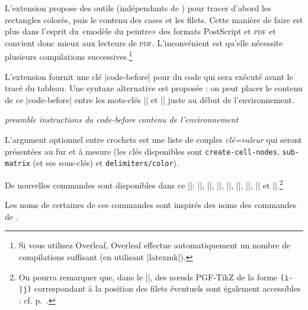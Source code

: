 \documentclass[dvipsnames]{article}%
\begin{document}
\label{color-in-code-before}

L'extension  propose des outils (indépendants de )
pour tracer d'abord les rectangles colorés, puis le contenu des cases et les
filets. Cette manière de faire est plus dans l'esprit du «modèle du peintre» des
formats PostScript et \textsc{pdf} et convient donc mieux aux lecteurs de
\textsc{pdf}. L'inconvénient est qu'elle nécessite plusieurs compilations
successives.\footnote{Si vous utilisez Overleaf, Overleaf effectue
  automatiquement un nombre de compilations suffisant (en utilisant |latexmk|).}

\medskip
L'extension  fournit une clé |code-before| pour du code qui sera
exécuté avant le tracé du tableau. Une syntaxe alternative est proposée : on
peut placer le contenu de ce |code-before| entre les mots-clés |\CodeBefore| et
|\Body| juste au début de l'environnement.

\smallskip
\begin{Code}
\begin{pNiceArray}{\textsl{preamble}}
\emph{}
  \textsl{instructions du code-before}
\emph{\Body}
  \textsl{contenu de l’environnement}
\end{pNiceArray}
\end{Code}

\smallskip
L'argument optionnel entre crochets est une liste de couples \textsl{clé=valeur}
qui seront présentées au fur et à mesure (les clés disponibles sont
  \texttt{create-cell-nodes}, \texttt{sub-matrix} (et ses sous-clés) et
  \texttt{delimiters/color}).

\smallskip
De nouvelles commandes sont disponibles dans ce |\CodeBefore|: |\cellcolor|,
|\rectanglecolor|, |\rowcolor|, |\columncolor|, |\rowcolors|, |\rowlistcolors|,
|\chessboardcolors| et |\arraycolor|.\footnote{On pourra remarquer que, dans le
  |\CodeBefore|, des nœuds PGF-TikZ de la forme \verb+(i-|j)+ correspondant à la
  position des filets éventuels sont également accessibles : cf.
  p.~\pageref{nodes-i}.}

Les noms de certaines de ces commandes sont inspirés des noms des commandes de .
\end{document}
